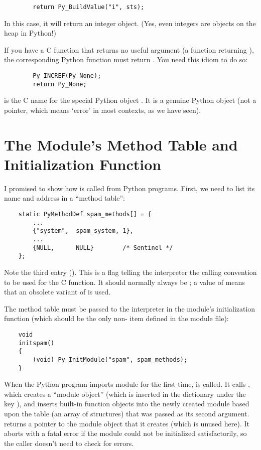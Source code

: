 \begin{verbatim}
        return Py_BuildValue("i", sts);
\end{verbatim}

In this case, it will return an integer object.  (Yes, even integers
are objects on the heap in Python!)

If you have a C function that returns no useful argument (a function
returning ), the corresponding Python function must return
.   You need this idiom to do so:

\begin{verbatim}
        Py_INCREF(Py_None);
        return Py_None;
\end{verbatim}

 is the C name for the special Python object
.  It is a genuine Python object (not a 
pointer, which means `error' in most contexts, as we have seen).


\section{The Module's Method Table and Initialization Function}

I promised to show how  is called from Python
programs.  First, we need to list its name and address in a ``method
table'':

\begin{verbatim}
    static PyMethodDef spam_methods[] = {
        ...
        {"system",  spam_system, 1},
        ...
        {NULL,      NULL}        /* Sentinel */
    };
\end{verbatim}

Note the third entry ().  This is a flag telling the
interpreter the calling convention to be used for the C function.  It
should normally always be ; a value of  means that an
obsolete variant of  is used.

The method table must be passed to the interpreter in the module's
initialization function (which should be the only non-
item defined in the module file):

\begin{verbatim}
    void
    initspam()
    {
        (void) Py_InitModule("spam", spam_methods);
    }
\end{verbatim}

When the Python program imports module  for the first time,
 is called.  It calls , which
creates a ``module object'' (which is inserted in the dictionary
 under the key ), and inserts built-in
function objects into the newly created module based upon the table
(an array of  structures) that was passed as its
second argument.   returns a pointer to the
module object that it creates (which is unused here).  It aborts with
a fatal error if the module could not be initialized satisfactorily,
so the caller doesn't need to check for errors.



